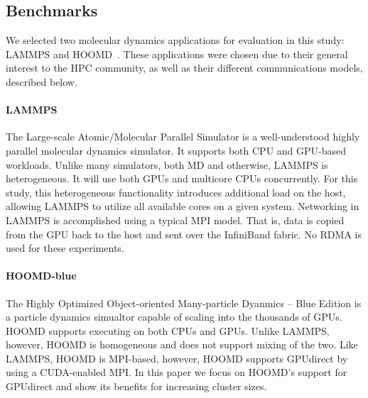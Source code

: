 \subsection{Benchmarks}
We selected two molecular dynamics applications for evaluation in this study:
LAMMPS and HOOMD~\cite{plimpton2007lammps,anderson2010hoomd}.  These
applications were chosen due to their general interest to the HPC community, as
well as their different communications models, described below.

\paragraph {LAMMPS} The Large-scale Atomic/Molecular Parallel Simulator is a
well-understood highly parallel molecular dynamics simulator.  It supports both
CPU and GPU-based workloads.  Unlike many simulators, both MD and otherwise,
LAMMPS is heterogeneous.  It will use both GPUs and multicore CPUs concurrently.
For this study, this heterogeneous functionality introduces additional load on
the host, allowing LAMMPS to utilize all available cores on a given system.
Networking in LAMMPS is accomplished using a typical MPI model. That is, data is
copied from the GPU back to the host and sent over the InfiniBand fabric.  No
RDMA is used for these experiments.  

\paragraph{HOOMD-blue} The Highly Optimized Object-oriented Many-particle
Dyanmics -- Blue Edition is a particle dynamics simualtor capable of
scaling into the thousands of GPUs.  HOOMD supports executing on both CPUs and
GPUs.  Unlike LAMMPS, however, HOOMD is homogeneous and does not support mixing
of the two.  Like LAMMPS, HOOMD is MPI-based, however, HOOMD supports
GPUdirect by using a CUDA-enabled MPI.  In this paper we focus on HOOMD's
support for GPUdirect and show its benefits for increasing cluster sizes.  


